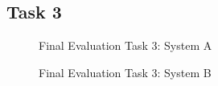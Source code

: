 \subsection*{Task 3}
\begin{figure}[!h]
  \centering
  \begin{minipage}[b]{0.47\textwidth}
    \caption{Final Evaluation Task 3: System A}
  \end{minipage}
  \hfill
  \begin{minipage}[b]{0.47\textwidth}
  \caption{Final Evaluation Task 3: System B}
  \end{minipage}
\end{figure}

